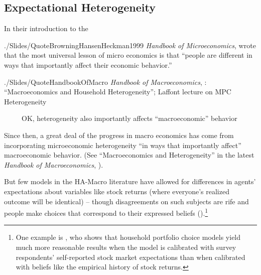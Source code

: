 \subsection{Expectational Heterogeneity}\label{EpiExpHet}
In their introduction to the 
\begin{verbatimwrite}{./Slides/QuoteBrowningHansenHeckman1999}
  \textit{Handbook of Microeconomics},  wrote that the most universal lesson of micro economics is that ``people are different in ways that importantly affect their economic behavior.''
\end{verbatimwrite}

\begin{verbatimwrite}{./Slides/QuoteHandbookOfMacro}
  \textit{Handbook of Macroeconomics}, \cite{kmpHandbook}: ``Macroeconomics and Household Heterogeneity'';  \cite{violante_marginal_2021} Laffont lecture on MPC Heterogeneity

  \pause \indent ~~~~~OK, heterogeneity also importantly affects ``macroeconomic'' behavior
\end{verbatimwrite}
Since then, a great deal of the progress in macro economics has come from incorporating microeconomic heterogeneity ``in ways that importantly affect'' macroeconomic behavior.  (See ``Macroeconomics and Heterogeneity'' in the latest \textit{Handbook of Macroeconomics}, \cite{kmpHandbook}).  


But few models in the HA-Macro literature have allowed for differences in agents' expectations about variables like stock returns (where everyone's realized outcome will be identical) -- though disagreements on such subjects are rife and people make choices that correspond to their expressed beliefs (\cite{gmsuBeliefs}).\footnote{One example is \cite{Velasquez2022}, who shows that household portfolio choice models yield much more reasonable results when the model is calibrated with survey respondents' self-reported stock market expectations than when calibrated with beliefs like the empirical history of stock returns.}


